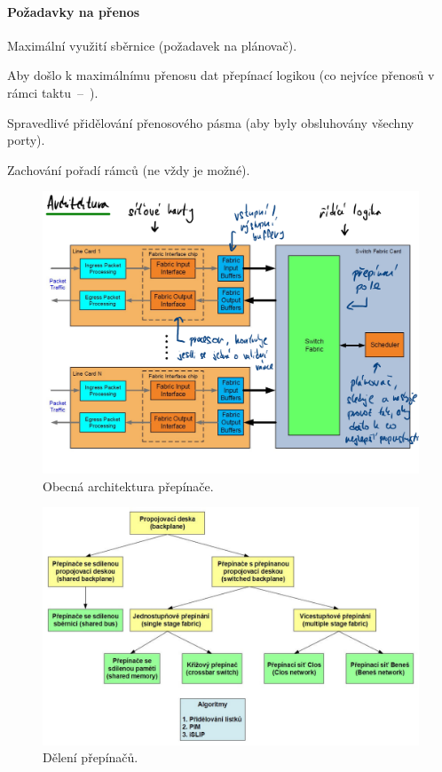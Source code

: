 \paragraph*{Požadavky na přenos} \begin{compactitem}
    \item Maximální využití sběrnice (požadavek na plánovač). \begin{compactitem}
        \item Aby došlo k maximálnímu přenosu dat přepínací logikou (co nejvíce přenosů v rámci taktu~--~).
    \end{compactitem}
    \item Spravedlivé přidělování přenosového pásma (aby byly obsluhovány všechny porty).
    \item Zachování pořadí rámců (ne vždy je možné).
\end{compactitem}

\begin{figure}[H]
    \centering
    \includegraphics[width=1\linewidth]{obecna_architektura.pdf}
    \caption{Obecná architektura přepínače.}
    \label{pds_obecna_architektura_prepinace}
\end{figure}

\begin{figure}[H]
    \centering
    \includegraphics[width=1\linewidth]{deleni_prepinacu.pdf}
    \caption{Dělení přepínačů.}
\end{figure}

